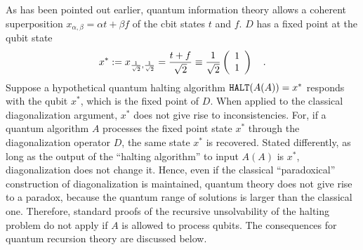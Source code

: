 \documentclass[prl,preprint,showpacs,showkeys,amsfonts,amsmath]{revtex4}
\begin{document}
As has been pointed out earlier,
quantum information theory allows a coherent superposition
$ x_{\alpha ,\beta}  =\alpha t+\beta f $
of the
cbit states $t$ and $f$.
$D$ has a fixed point at the qubit state
\begin{equation}
x^\ast :=x_{ {1\over \sqrt{2}},{1\over \sqrt{2}} }  ={t+f\over \sqrt{2}}
\equiv
{1\over \sqrt{2}} \left(
\begin{array}{c}
1 \\
1
 \end{array}
\right) \quad .
\end{equation}
Suppose a hypothetical quantum halting algorithm ${\tt HALT} ( A(A) ) = x^\ast$
responds with the qubit $x^\ast$, which is the fixed point of $D$.
When applied to the classical diagonalization argument, $x^\ast$
does not give rise to inconsistencies.
For, if a quantum algorithm $A$ processes the fixed point state
$x ^\ast $ through the diagonalization
operator $D$, the same state
$x^\ast $ is recovered.
Stated differently, as long as the output of the ``halting
algorithm'' to input $A(A)$ is $x^\ast$, diagonalization does not
change it. Hence, even if the classical ``paradoxical'' construction
of diagonalization is maintained, quantum theory does not give rise to a
paradox, because the quantum range of solutions is larger than the
classical one.
Therefore,
standard proofs of the recursive unsolvability of the halting problem
do not apply if $A$ is allowed to process qubits. The consequences for
quantum recursion theory are discussed below.
\end{document}
